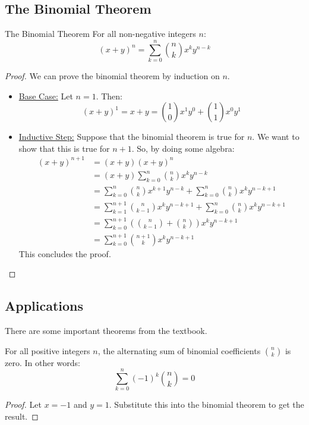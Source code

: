 \documentclass[letterpaper]{article}
\begin{document}
\subsection{The Binomial Theorem}
\begin{theorem}{The Binomial Theorem}{}
    For all non-negative integers $n$:
    \[(x + y)^n = \sum_{k = 0}^n \binom{n}{k} x^k y^{n - k}\]
\end{theorem}

\begin{proof}
    We can prove the binomial theorem by induction on $n$. 

    \begin{itemize}
        \item \underline{Base Case:} Let $n = 1$. Then:
        \[(x + y)^1 = x + y = \binom{1}{0}x^1 y^0 + \binom{1}{1} x^0 y^1\]

        \item \underline{Inductive Step:} Suppose that the binomial theorem is true for $n$. We want to show that this is true for $n + 1$. So, by doing some algebra:
        \begin{equation*}
            \begin{aligned}
                (x + y)^{n + 1} &= (x + y)(x + y)^n \\ 
                    &= (x + y)\sum_{k = 0}^n \binom{n}{k} x^k y^{n - k} \\ 
                    &= \sum_{k = 0}^n \binom{n}{k} x^{k + 1} y^{n - k} + \sum_{k = 0}^n \binom{n}{k} x^k y^{n - k + 1} \\ 
                    &= \sum_{k = 1}^{n + 1} \binom{n}{k - 1} x^k y^{n - k + 1} + \sum_{k = 0}^n \binom{n}{k} x^k y^{n - k + 1} \\ 
                    &= \sum_{k = 0}^{n + 1} \left(\binom{n}{k - 1} + \binom{n}{k}\right) x^k y^{n - k + 1} \\ 
                    &= \sum_{k = 0}^{n + 1} \binom{n + 1}{k} x^k y^{n - k + 1}
            \end{aligned}
        \end{equation*}
        This concludes the proof. \qedhere
    \end{itemize}
\end{proof}

\subsection{Applications}
There are some important theorems from the textbook. 
\begin{theorem}{}{}
    For all positive integers $n$, the alternating sum of binomial coefficients $\binom{n}{k}$ is zero. In other words:
    \[\sum_{k = 0}^n (-1)^k \binom{n}{k} = 0\]
\end{theorem}
\begin{proof}
    Let $x = -1$ and $y = 1$. Substitute this into the binomial theorem to get the result. 
\end{proof}
\end{document}
